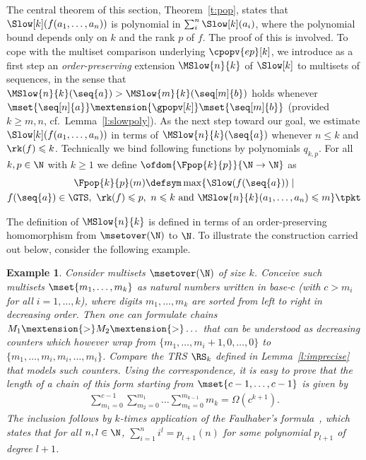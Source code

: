 \documentclass{LMCS}
\newtheorem{example}[thm]{Example}
\begin{document}
The central theorem of this section, Theorem~\ref{t:pop}, states that $\Slow[k](f(a_1, \dots, a_n))$
is polynomial in $\sum_{i}^n \Slow[k](a_i)$, 
where the polynomial bound depends only on $k$ and the rank $p$ of $f$.
The proof of this is involved.
To cope with the multiset comparison underlying $\cpopv{ep}[k]$,
we introduce as a first step an \emph{order-preserving} 
extension $\MSlow{n}{k}$ of $\Slow[k]$ to multisets of sequences, 
in the sense that $\MSlow{n}{k}(\seq{a}) > \MSlow{m}{k}(\seq[m]{b})$ holds 
whenever $\mset{\seq[n]{a}} \mextension{\gpopv[k]} \mset{\seq[m]{b}}$ 
(provided $k \geqslant m,n$, cf.~Lemma~\ref{l:slowpoly}).
As the next step toward our goal, we estimate $\Slow[k](f(a_1,\dots,a_n))$ in terms 
of $\MSlow{n}{k}(\seq{a})$
whenever $n \leqslant k$ and $\rk(f) \leqslant k$.
Technically we bind following functions by polynomials $q_{k,p}$. 
For all $k,p \in \N$ with $k \geqslant 1$
we define $\ofdom{\Fpop{k}{p}}{\N \to \N}$ as 
  \begin{multline*}
    \Fpop{k}{p}(m) \defsym \max\{ \Slow(f(\seq{a})) \mid \\
    f(\seq{a}) \in \GTS,
    ~\rk(f) \leqslant p,~n \leqslant k
    \text{ and } \MSlow{n}{k}(a_1,\dots,a_n) \leqslant m \} \tpkt
  \end{multline*}


The definition of $\MSlow{n}{k}$ is defined in terms of an order-preserving homomorphism from $\msetover(\N)$ to $\N$. 
To illustrate the construction carried out below, consider the following example.
\begin{example}\label{ex:multisets}
  Consider multisets $\msetover(\N)$ of size $k$.
Conceive such multisets $\mset{m_1,\dots,m_k}$ as 
  natural 
  numbers written in base-$c$ (with $c>m_i$ for all $i = 1,\dots,k$), 
  where digits $m_1,\dots,m_k$ are sorted from left to right in decreasing order.
  Then one can formulate chains $M_1 \mextension{>} M_2 \mextension{>} \dots$ 
  that can be understood as decreasing counters 
  which however wrap from
  $\{m_1,\dots, m_i+1,0,\dots,0\}$ to $\{m_1,\dots, m_i,m_i,\dots,m_i\}$. 
  Compare the TRS $\RS_k$ defined in Lemma~\ref{l:imprecise} that models such counters.\@
  Using the correspondence, it is
  easy to prove that the length of a chain of this form
  starting from $\mset{c-1,\dots,c-1}$
  is given by
  \begin{align*}
  \sum_{m_1=0}^{c-1} \sum_{m_2=0}^{m_1} \dots \sum_{m_k=0}^{m_{k-1}} m_k = \Omega(c^{k+1}). 
  \end{align*}
  The inclusion follows by $k$-times application of the 
  Faulhaber's formula~\cite{K93}, which states that 
  for all $n,l \in \N$, 
  $\sum_{i=1}^n i^l = p_{l+1}(n)$ for some polynomial $p_{l+1}$ of degree $l+1$. 
\end{example}
\end{document}
